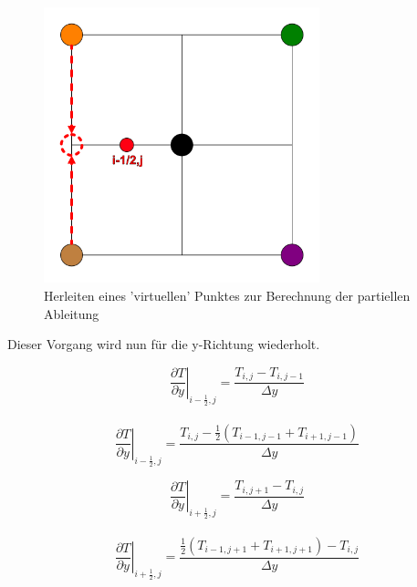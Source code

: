 \documentclass[twoside,10pt,a4paper]{article}
\numberwithin{equation}{section}					%
\numberwithin{figure}{section}						%
\begin{document}
    \begin{figure}[H]
        \centering
        \includegraphics[width=8cm]{bilder/xstar.png}
        \caption{Herleiten eines 'virtuellen' Punktes zur Berechnung der partiellen Ableitung}
        \label{fig:3}
    \end{figure}
 Dieser Vorgang wird nun für die y-Richtung wiederholt.
 \begin{multicols}{2}

\begin{equation}
    \left.\frac{\partial T}{\partial y}\right|_{i-\frac{1}{2},j}=\frac{T_{i,j}-T_{i,j-1}}{\Delta y}
\end{equation}
 \\
\begin{equation}
    \left.\frac{\partial T}{\partial y}\right|_{i-\frac{1}{2},j}=\frac{T_{i,j}-\frac{1}{2}(T_{i-1,j-1}+T_{i+1,j-1})}{\Delta y}
\end{equation}
\end{multicols}

 \begin{multicols}{2}

\begin{equation}
    \left.\frac{\partial T}{\partial y}\right|_{i+\frac{1}{2},j}=\frac{T_{i,j+1}-T_{i,j}}{\Delta y}
\end{equation}
 \\
\begin{equation}
    \left.\frac{\partial T}{\partial y}\right|_{i+\frac{1}{2},j}=\frac{\frac{1}{2}(T_{i-1,j+1}+T_{i+1,j+1})-T_{i,j}}{\Delta y}
\end{equation}
\end{multicols}
\end{document}
